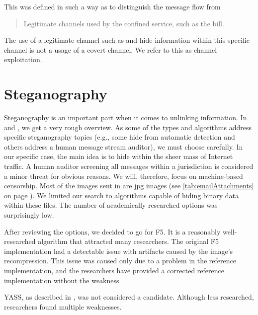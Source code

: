 This was defined  in such a way as to distinguish the message flow from 

\begin{quote}
	Legitimate channels used by the confined service, such as the bill.
\end{quote}

The use of a legitimate channel such as  and hide information within this specific channel is not a usage of a covert channel. We refer to this as channel exploitation.

\section{Steganography}
Steganography is an important part when it comes to unlinking information. In \cite{6828087} and \cite{subhedar2014current}, we get a very rough overview. As some of the types and algorithms address specific steganography topics (e.g., some hide from automatic detection and others address a human message stream auditor), we must choose carefully. In our specific case, the main idea is to hide within the sheer mass of Internet traffic. A human auditor screening all messages within a jurisdiction is considered a minor threat for obvious reasons. We will, therefore,  focus on machine-based censorship. Most of the images sent in  are jpg images (see \cref{tab:emailAttachments} on page \pageref{tab:emailAttachments}). We limited our search to algorithms capable of hiding binary data within these files. The number of academically researched options was surprisingly low.

After reviewing the options, we decided to go for F5\cite{f5}. It is a reasonably well-researched algorithm that attracted many researchers. The original F5 implementation had a detectable issue with artifacts\cite{F5broken} caused by the image's recompression. This issue was caused only due to a problem in the reference implementation, and the researchers have provided a corrected reference implementation without the weakness.


YASS, as described in \cite{solanki2007yass}, was not considered a candidate. Although less researched, researchers found multiple weakness\-es\cite{kodovsky2010modern,li2009steganalysis}.


